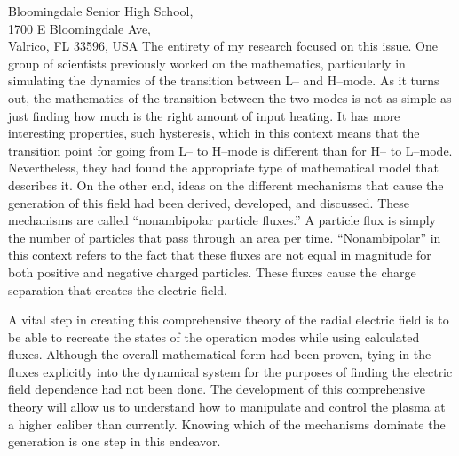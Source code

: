 \documentclass[12pt,a4paper]{letter}
\begin{document}
\begin{letter}{
	Bloomingdale Senior High School,\\
	1700 E Bloomingdale Ave,\\
	Valrico, FL 33596, USA
}
The entirety of my research focused on this issue.
One group of scientists previously worked on the mathematics, particularly in simulating the dynamics of the transition between L-- and H--mode.
As it turns out, the mathematics of the transition between the two modes is not as simple as just finding how much is the right amount of input heating.
It has more interesting properties, such hysteresis, which in this context means that the transition point for going from L-- to H--mode is different than for H-- to L--mode.
Nevertheless, they had found the appropriate type of mathematical model that describes it.
On the other end, ideas on the different mechanisms that cause the generation of this field had been derived, developed, and discussed.
These mechanisms are called ``nonambipolar particle fluxes.''
A particle flux is simply the number of particles that pass through an area per time.
``Nonambipolar'' in this context refers to the fact that these fluxes are not equal in magnitude for both positive and negative charged particles.
These fluxes cause the charge separation that creates the electric field.

A vital step in creating this comprehensive theory of the radial electric field is to be able to recreate the states of the operation modes while using calculated fluxes.
Although the overall mathematical form had been proven, tying in the fluxes explicitly into the dynamical system for the purposes of finding the electric field dependence had not been done.
The development of this comprehensive theory will allow us to understand how to manipulate and control the plasma at a higher caliber than currently.
Knowing which of the mechanisms dominate the generation is one step in this endeavor.


\end{letter}
\end{document}
